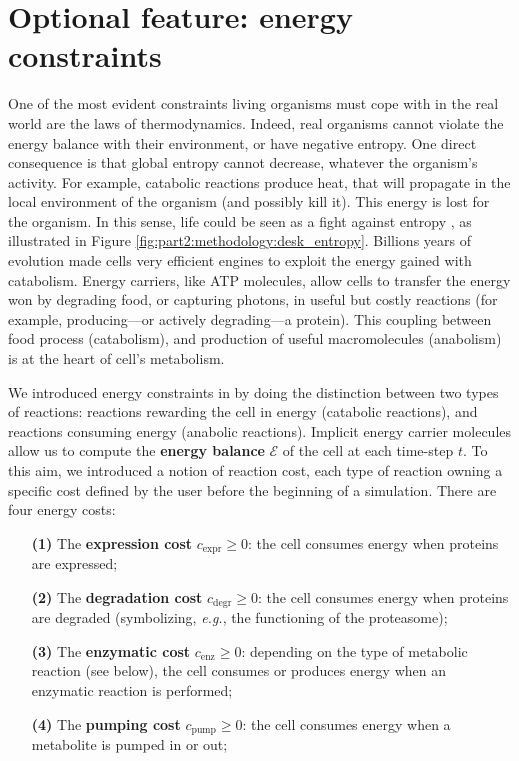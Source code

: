 \section{Optional feature: energy constraints}
\label{sec:part2:methodology:energy_constraints}

One of the most evident constraints living organisms must cope with in the real world are the laws of thermodynamics. Indeed, real organisms cannot violate the energy balance with their environment, or have negative entropy. One direct consequence is that global entropy cannot decrease, whatever the organism's activity. For example, catabolic reactions produce heat, that will propagate in the local environment of the organism (and possibly kill it). This energy is lost for the organism.
In this sense, life could be seen as a fight against entropy \citep{alberts-et-al-2013}, as illustrated in Figure \ref{fig:part2:methodology:desk_entropy}.
Billions years of evolution made cells very efficient engines to exploit the energy gained with catabolism. Energy carriers, like ATP molecules, allow cells to transfer the energy won by degrading food, or capturing photons, in useful but costly reactions (for example, producing---or actively degrading---a protein). This coupling between food process (catabolism), and production of useful macromolecules (anabolism) is at the heart of cell's metabolism.

We introduced energy constraints in {\EvoEvoSim} by doing the distinction between two types of reactions: reactions rewarding the cell in energy (catabolic reactions), and reactions consuming energy (anabolic reactions). Implicit energy carrier molecules allow us to compute the \textbf{energy balance} $\mathcal{E}$ of the cell at each time-step $t$. To this aim, we introduced a notion of reaction cost, each type of reaction owning a specific cost defined by the user before the beginning of a simulation. There are four energy costs:
\begin{enumerate}
\item[\textbf{(1)}] The \textbf{expression cost} $c_{\text{expr}} \geq 0$: the cell consumes energy when proteins are expressed;
\item[\textbf{(2)}] The \textbf{degradation cost} $c_{\text{degr}} \geq 0$: the cell consumes energy when proteins are degraded (symbolizing, \textit{e.g.}, the functioning of the proteasome);
\item[\textbf{(3)}] The \textbf{enzymatic cost} $c_{\text{enz}} \geq 0$: depending on the type of metabolic reaction (see below), the cell consumes or produces energy when an enzymatic reaction is performed;
\item[\textbf{(4)}] The \textbf{pumping cost} $c_{\text{pump}} \geq 0$: the cell consumes energy when a metabolite is pumped in or out;
\end{enumerate}

